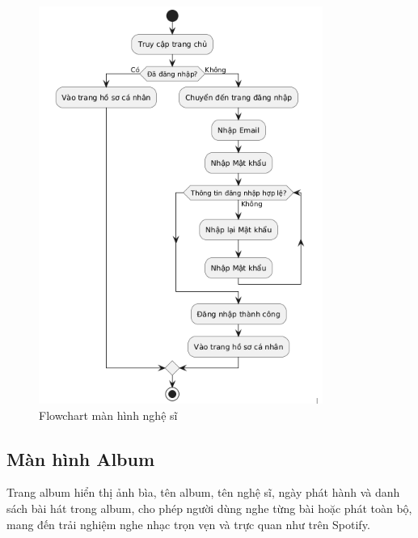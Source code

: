 \begin{figure}
    \centering
    \includegraphics[width=1\linewidth]{flowchart-nghe-si.png}
    \caption{Flowchart màn hình nghệ sĩ}
    \label{fig:flowchart-nghe-si}
\end{figure}

\subsection{Màn hình Album}
\label{subsec:album}

Trang album hiển thị ảnh bìa, tên album, tên nghệ sĩ, ngày phát hành và danh sách bài hát trong album, cho phép người dùng nghe từng bài hoặc phát toàn bộ, mang đến trải nghiệm nghe nhạc trọn vẹn và trực quan như trên Spotify.


